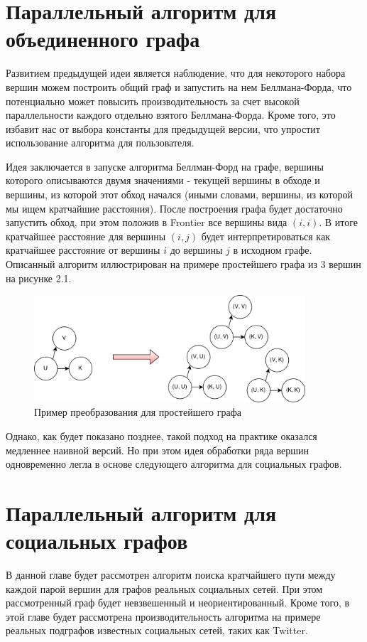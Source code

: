 \FloatBarrier
\section{Параллельный алгоритм для объединенного графа}
Развитием предыдущей идеи является наблюдение, что для некоторого набора вершин можем построить общий граф и запустить на нем Беллмана-Форда, что потенциально может повысить производительность за счет высокой параллельности каждого отдельно взятого Беллмана-Форда. Кроме того, это избавит нас от выбора константы для предыдущей версии, что упростит использование алгоритма для пользователя. 

Идея заключается в запуске алгоритма Беллман-Форд на графе, вершины которого описываются двумя значениями - текущей вершины в обходе и вершины, из которой этот обход начался (иными словами, вершины, из которой мы ищем кратчайшие расстояния). После построения графа будет достаточно запустить обход, при этом положив в Frontier все вершины вида $(i, i)$. В итоге кратчайшее расстояние для вершины $(i, j)$ будет интерпретироваться как кратчайшее расстояние от вершины $i$ до вершины $j$ в исходном графе. Описанный алгоритм иллюстрирован на примере простейшего графа из 3 вершин на рисунке 2.1. 
\FloatBarrier

\begin{figure}[h]
\caption{Пример преобразования для простейшего графа}
\centering
\includegraphics[width=0.9\textwidth]{img/floyd_par_2.png}
\end{figure}
\FloatBarrier

Однако, как будет показано позднее, такой подход на практике оказался медленнее наивной версий. Но при этом идея обработки ряда вершин одновременно легла в основе следующего алгоритма для социальных графов. 
\FloatBarrier
\section{Параллельный алгоритм для социальных графов}
В данной главе будет рассмотрен алгоритм поиска кратчайшего пути между каждой парой вершин для графов реальных социальных сетей. При этом рассмотренный граф будет невзвешенный и неориентированный. Кроме того, в этой главе будет рассмотрена производительность алгоритма на примере реальных подграфов известных социальных сетей, таких как Twitter.

